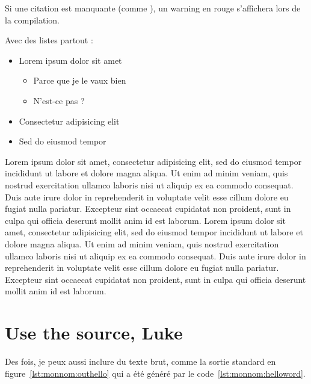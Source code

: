 Si une citation est manquante (comme \cite{monnom:referencefoireuse}),
un warning en rouge s'affichera lors de la compilation.

Avec des listes partout :

\begin{itemize}
\item Lorem ipsum dolor sit amet
  \begin{itemize}
  \item Parce que je le vaux bien
  \item N'est-ce pas ?
  \end{itemize}
\item Consectetur adipisicing elit
\item Sed do eiusmod tempor
\end{itemize}

Lorem ipsum dolor sit amet, consectetur adipisicing elit, sed do
eiusmod tempor incididunt ut labore et dolore magna aliqua. Ut enim ad
minim veniam, quis nostrud exercitation ullamco laboris nisi ut
aliquip ex ea commodo consequat. Duis aute irure dolor in
reprehenderit in voluptate velit esse cillum dolore eu fugiat nulla
pariatur. Excepteur sint occaecat cupidatat non proident, sunt in
culpa qui officia deserunt mollit anim id est laborum. Lorem ipsum
dolor sit amet, consectetur adipisicing elit, sed do eiusmod tempor
incididunt ut labore et dolore magna aliqua. Ut enim ad minim veniam,
quis nostrud exercitation ullamco laboris nisi ut aliquip ex ea
commodo consequat. Duis aute irure dolor in reprehenderit in voluptate
velit esse cillum dolore eu fugiat nulla pariatur. Excepteur sint
occaecat cupidatat non proident, sunt in culpa qui officia deserunt
mollit anim id est laborum.

\section{Use the source, Luke}


Des fois, je peux aussi inclure du texte brut, comme la sortie
standard en figure~\ref{lst:monnom:outhello} qui a été généré par le
code~\ref{lst:monnom:helloword}.

